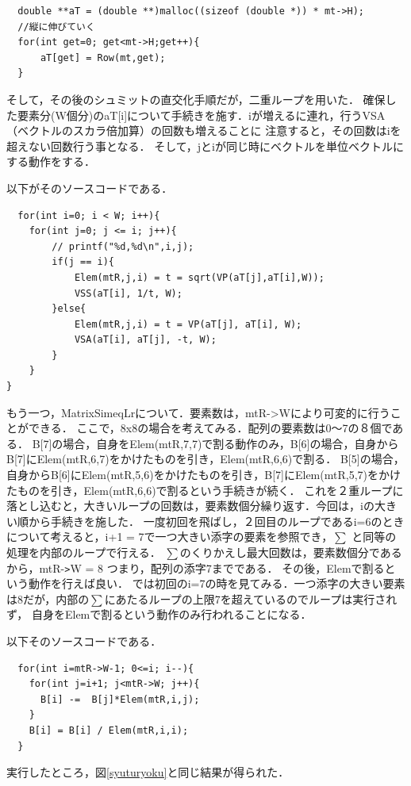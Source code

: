 \documentclass[11pt]{jarticle}
\begin{document}
\begin{verbatim}
  double **aT = (double **)malloc((sizeof (double *)) * mt->H);
  //縦に伸びていく　
  for(int get=0; get<mt->H;get++){
      aT[get] = Row(mt,get);
  }
\end{verbatim}


そして，その後のシュミットの直交化手順だが，二重ループを用いた．
確保した要素分(W個分)のaT[i]について手続きを施す．iが増えるに連れ，行うVSA（ベクトルのスカラ倍加算）の回数も増えることに
注意すると，その回数はiを超えない回数行う事となる．
そして，jとiが同じ時にベクトルを単位ベクトルにする動作をする．

以下がそのソースコードである．
\begin{verbatim}
  for(int i=0; i < W; i++){
    for(int j=0; j <= i; j++){
        // printf("%d,%d\n",i,j);
        if(j == i){
            Elem(mtR,j,i) = t = sqrt(VP(aT[j],aT[i],W));
            VSS(aT[i], 1/t, W);
        }else{
            Elem(mtR,j,i) = t = VP(aT[j], aT[i], W);
            VSA(aT[i], aT[j], -t, W);
        }
    }
}
\end{verbatim}

もう一つ，MatrixSimeqLrについて．要素数は，mtR->Wにより可変的に行うことができる．
ここで，8x8の場合を考えてみる．配列の要素数は0～7の８個である．
B[7]の場合，自身をElem(mtR,7,7)で割る動作のみ，B[6]の場合，自身からB[7]にElem(mtR,6,7)をかけたものを引き，Elem(mtR,6,6)で割る．
B[5]の場合，自身からB[6]にElem(mtR,5,6)をかけたものを引き，B[7]にElem(mtR,5,7)をかけたものを引き，Elem(mtR,6,6)で割るという手続きが続く．
これを２重ループに落とし込むと，大きいループの回数は，要素数個分繰り返す．今回は，iの大きい順から手続きを施した．
一度初回を飛ばし，２回目のループであるi=6のときについて考えると，i+1 = 7で一つ大きい添字の要素を参照でき，$\sum$ と同等の処理を内部のループで行える．
$\sum$のくりかえし最大回数は，要素数個分であるから，mtR-\verb|>|W = 8 つまり，配列の添字7までである．
その後，Elemで割るという動作を行えば良い．
では初回のi=7の時を見てみる．一つ添字の大きい要素は8だが，内部の$\sum$にあたるループの上限7を超えているのでループは実行されず，
自身をElemで割るという動作のみ行われることになる．

以下そのソースコードである．
\begin{verbatim}
  for(int i=mtR->W-1; 0<=i; i--){
    for(int j=i+1; j<mtR->W; j++){
      B[i] -=  B[j]*Elem(mtR,i,j);
    }
    B[i] = B[i] / Elem(mtR,i,i);
  }
\end{verbatim}

実行したところ，図\ref{syuturyoku}と同じ結果が得られた．
\end{document}
